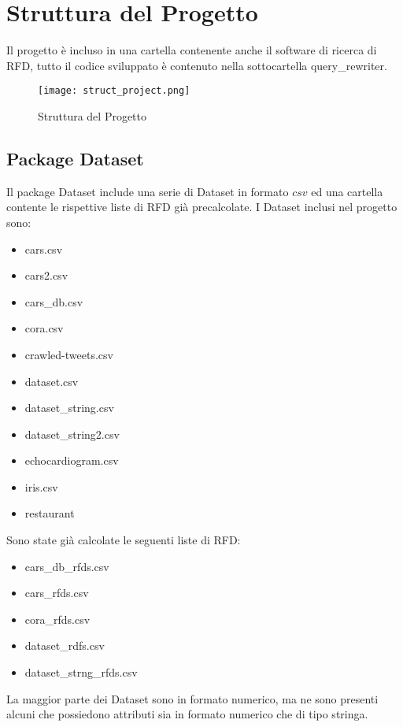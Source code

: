 \section{Struttura del Progetto}
Il progetto è incluso in una cartella contenente anche il software di ricerca di RFD, tutto il codice sviluppato è contenuto nella sottocartella query{\_}rewriter.
\begin{figure}[H]
    \centering
    \texttt{[image: struct\_project.png]}
    \caption{Struttura del Progetto}
    \label{fig:struct_project}
\end{figure}

\subsection{Package Dataset}
Il package Dataset include una serie di Dataset in formato $csv$ ed una cartella contente le rispettive liste di RFD già precalcolate. I Dataset inclusi nel progetto sono:
\begin{itemize}[noitemsep]
\let\labelitemi\labelitemii
    \item cars.csv
    \item cars2.csv
    \item cars{\_}db.csv
    \item cora.csv
    \item crawled-tweets.csv
    \item dataset.csv
    \item dataset{\_}string.csv
    \item dataset{\_}string2.csv
    \item echocardiogram.csv
    \item iris.csv
    \item restaurant
\end{itemize}

Sono state già calcolate le seguenti liste di RFD:
\begin{itemize}[noitemsep]
\let\labelitemi\labelitemii
    \item cars{\_}db{\_}rfds.csv
    \item cars{\_}rfds.csv
    \item cora{\_}rfds.csv
    \item dataset{\_}rdfs.csv
    \item dataset{\_}strng{\_}rfds.csv
\end{itemize}


La maggior parte dei Dataset sono in formato numerico, ma ne sono presenti alcuni che possiedono attributi sia in formato numerico che di tipo stringa.

